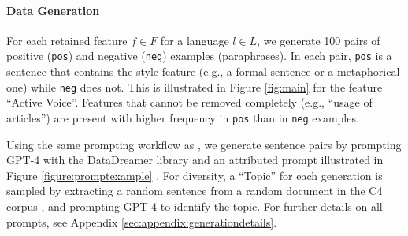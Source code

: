\paragraph{Data Generation} For each retained feature $f \in F$ for a language $l \in L$, we generate 100 pairs of positive ({\tt pos}) and negative ({\tt neg}) examples (paraphrases). In each pair, {\tt pos} is a sentence that contains the style feature (e.g., a formal sentence or a metaphorical one) while {\tt neg} does not. This is illustrated in Figure \ref{fig:main} for the feature ``Active Voice''. Features that cannot be removed completely (e.g., ``usage of articles'') are present with higher frequency in {\tt pos} than in {\tt neg} examples.

Using the same prompting workflow as \citet{patel2024styledistancestrongercontentindependentstyle}, we generate sentence pairs by prompting GPT-4 with the DataDreamer library and an attributed prompt \citep{attrprompt} illustrated in Figure \ref{figure:promptexample} \citep{gpt4, datadreamer}. For diversity, a ``Topic'' for each generation is sampled by extracting a random sentence from a random document in the C4 corpus \citep{t5andc4}, and prompting GPT-4 to identify the topic. For further details on all prompts, see Appendix \ref{sec:appendix:generationdetails}. 



